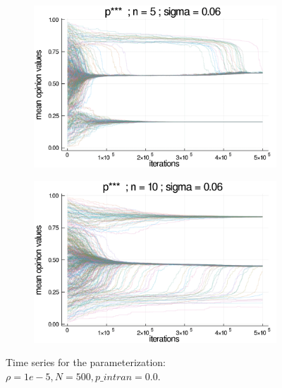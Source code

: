 \documentclass{article}
\begin{document}
\begin{figure}[H]
      \begin{subfigure}[b]{0.49\textwidth}
        \includegraphics[width=\textwidth]{img/series/tseries6/Poodlcalculatepsssn5-rho10e-5-sigma006-00intransrandom.png}
      \end{subfigure}
            \begin{subfigure}[b]{0.49\textwidth}
        \includegraphics[width=\textwidth]{img/series/tseries6/Poodlcalculatepsssn10-rho10e-5-sigma006-00intransrandom.png}
      \end{subfigure}
      \caption{Time series for the parameterization: \(\rho = 1e-5, N = 500,
        p\_intran = 0.0 \).}
  \label{fig:tseries6}
    \end{figure}
\end{document}

